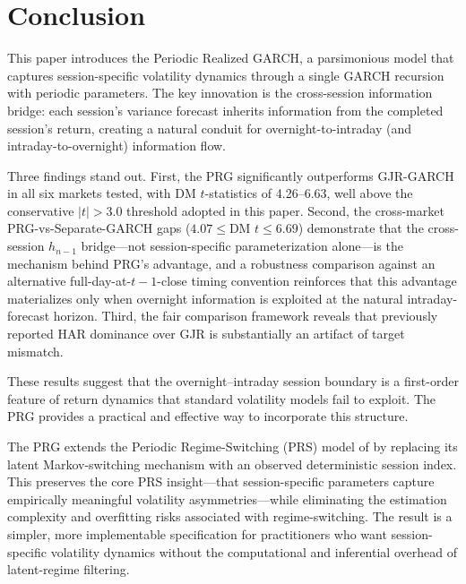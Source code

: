 \documentclass[11pt,a4paper]{article}
\begin{document}
\section{Conclusion}

This paper introduces the Periodic Realized GARCH, a parsimonious model that captures session-specific volatility dynamics through a single GARCH recursion with periodic parameters. The key innovation is the cross-session information bridge: each session's variance forecast inherits information from the completed session's return, creating a natural conduit for overnight-to-intraday (and intraday-to-overnight) information flow.

Three findings stand out. First, the PRG significantly outperforms GJR-GARCH in all six markets tested, with DM $t$-statistics of 4.26--6.63, well above the conservative $|t|>3.0$ threshold adopted in this paper. Second, the cross-market PRG-vs-Separate-GARCH gaps ($4.07 \leq \text{DM } t \leq 6.69$) demonstrate that the cross-session $h_{n-1}$ bridge---not session-specific parameterization alone---is the mechanism behind PRG's advantage, and a robustness comparison against an alternative full-day-at-$t{-}1$-close timing convention reinforces that this advantage materializes only when overnight information is exploited at the natural intraday-forecast horizon. Third, the fair comparison framework reveals that previously reported HAR dominance over GJR is substantially an artifact of target mismatch.

These results suggest that the overnight--intraday session boundary is a first-order feature of return dynamics that standard volatility models fail to exploit. The PRG provides a practical and effective way to incorporate this structure.

The PRG extends the Periodic Regime-Switching (PRS) model of \citet{Lai2024} by replacing its latent Markov-switching mechanism with an observed deterministic session index. This preserves the core PRS insight---that session-specific parameters capture empirically meaningful volatility asymmetries---while eliminating the estimation complexity and overfitting risks associated with regime-switching. The result is a simpler, more implementable specification for practitioners who want session-specific volatility dynamics without the computational and inferential overhead of latent-regime filtering.
\end{document}
